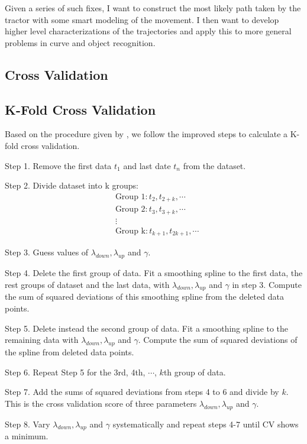 Given a series of such fixes, I want to construct the most likely path taken by the tractor with some smart modeling of the movement. I then want to develop higher level characterizations of the trajectories and apply this to more general problems in curve and object recognition.



\subsection{Cross Validation}

\subsection{K-Fold Cross Validation}

Based on the procedure given by \cite{wahba1975completely}, we  follow the improved steps to calculate a K-fold cross validation. 

Step 1. Remove the first data $t_1$ and last date $t_n$ from the dataset.

Step 2. Divide dataset into k groups:
\begin{align*}
& \mbox{Group 1}: t_2, t_{2+k}, \cdots \\
& \mbox{Group 2}: t_3, t_{3+k}, \cdots \\
& \vdots \\
& \mbox{Group k}: t_{k+1}, t_{2k+1}, \cdots
\end{align*}


Step 3. Guess values of $\lambda_{down}, \lambda_{up}$ and $\gamma$.

Step 4. Delete the first group of data. Fit a smoothing spline to the first data, the rest groups of dataset and the last data, with  $\lambda_{down}, \lambda_{up}$ and $\gamma$ in step 3. Compute the sum of squared deviations of this smoothing spline from the deleted data points.

Step 5. Delete instead the second group of data. Fit a smoothing spline to the remaining data with  $\lambda_{down}, \lambda_{up}$ and $\gamma$. Compute the sum of squared deviations of the spline from deleted data points.

Step 6. Repeat Step 5 for the 3rd, 4th, $\cdots$, $k$th group of data.

Step 7. Add the sums of squared deviations from steps 4 to 6 and divide by $k$. This is the cross validation score of three parameters  $\lambda_{down}, \lambda_{up}$ and $\gamma$.

Step 8. Vary  $\lambda_{down}, \lambda_{up}$ and $\gamma$ systematically and repeat steps 4-7 until CV shows a minimum.



